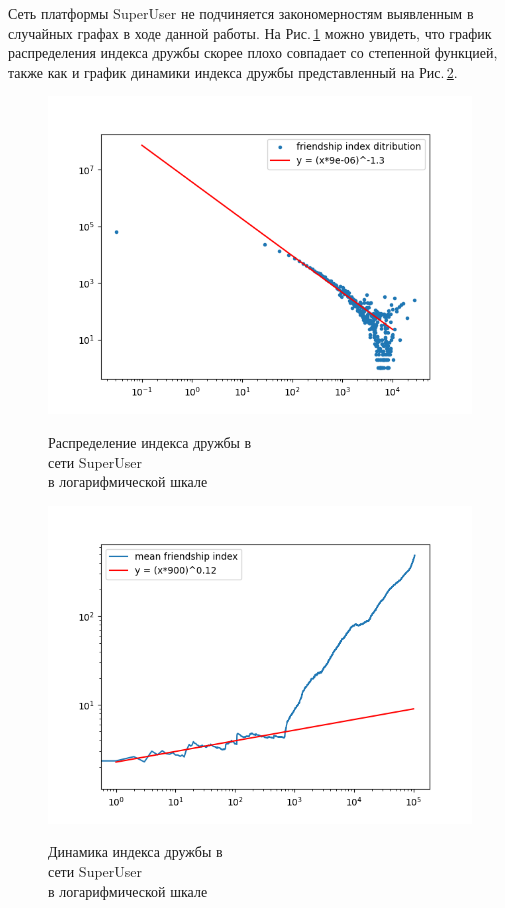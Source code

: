 \documentclass[bachelor, och, diploma]{SCWorks}
\begin{document}
Сеть платформы SuperUser не подчиняется закономерностям выявленным в случайных графах в ходе данной работы. На Рис.\,\ref{fig:sus} можно увидеть, что график распределения индекса дружбы скорее плохо совпадает со степенной функцией, также как и график динамики индекса дружбы представленный на Рис.\,\ref{fig:sud}.
\begin{figure}[!ht]
\centering
\includegraphics[scale=0.7]{diploma_results/static_real_log/sx-superuser.png}\\
\caption{Распределение индекса дружбы  в\\ сети SuperUser\\ в логарифмической шкале}\label{fig:sus}
\end{figure}
\begin{figure}[!ht]
\centering
\includegraphics[scale=0.7]{diploma_results/dynamic_real_log/sx-superuser_mean.png}\\
\caption{Динамика индекса дружбы  в\\ сети SuperUser\\ в логарифмической шкале}\label{fig:sud}
\end{figure}
\end{document}
